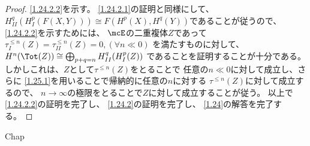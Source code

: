 \documentclass[uplatex,dvipdfmx]{jsarticle}
\begin{document}
\begin{proof}
  \ref{1.24.2.2}を示す。
  \ref{1.24.2.1}の証明と同様にして、
  \(H_{II}^q(H_I^p(F(X,Y)))\cong F(H^p(X),H^q(Y))\)であることが従うので、
  \ref{1.24.2.2}を示すためには、
  \(\mcE\)の二重複体\(Z\)であって
  \(\tau_I^{\leq n}(Z)=\tau_{II}^{\leq n}(Z) = 0, (\forall n \ll 0)\)
  を満たすものに対して、
  \(H^n(\Tot(Z)) \cong \bigoplus_{p+q=n}H_{II}^q(H_I^p(Z))\)
  であることを証明することが十分である。
  しかしこれは、\(Z\)として\(\tau^{\leq n}(Z)\)をとることで
  任意の\(n\ll 0\)に対して成立し、さらに
  \autoref{1.25.1}を用いることで帰納的に任意の\(n\)に対する
  \(\tau^{\leq n}(Z)\)に対して成立するので、
  \(n\to \infty\)の極限をとることで\(Z\)に対して成立することが従う。
  以上で\ref{1.24.2.2}の証明を完了し、
  \ref{1.24.2}の証明を完了し、
  \autoref{1.24}の解答を完了する。
\end{proof}






\ifcsname Chap\endcsname\else
\printbibliography
\end{document}
